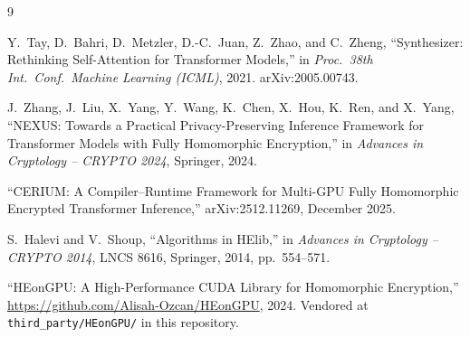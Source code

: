 \documentclass[11pt,a4paper]{article}
\begin{document}
\begin{thebibliography}{9}

Y.~Tay, D.~Bahri, D.~Metzler, D.-C.~Juan, Z.~Zhao, and C.~Zheng,
\newblock ``Synthesizer: Rethinking Self-Attention for Transformer Models,''
\newblock in \emph{Proc.\ 38th Int.\ Conf.\ Machine Learning (ICML)}, 2021.
\newblock arXiv:2005.00743.

J.~Zhang, J.~Liu, X.~Yang, Y.~Wang, K.~Chen, X.~Hou, K.~Ren, and X.~Yang,
\newblock ``NEXUS: Towards a Practical Privacy-Preserving Inference
Framework for Transformer Models with Fully Homomorphic Encryption,''
\newblock in \emph{Advances in Cryptology -- CRYPTO 2024}, Springer, 2024.

\newblock ``CERIUM: A Compiler--Runtime Framework for Multi-GPU Fully
Homomorphic Encrypted Transformer Inference,''
\newblock arXiv:2512.11269, December 2025.

S.~Halevi and V.~Shoup,
\newblock ``Algorithms in HElib,''
\newblock in \emph{Advances in Cryptology -- CRYPTO 2014}, LNCS 8616,
Springer, 2014, pp.~554--571.

\newblock ``HEonGPU: A High-Performance CUDA Library for Homomorphic
Encryption,'' \url{https://github.com/Alisah-Ozcan/HEonGPU}, 2024.
Vendored at \texttt{third\_party/HEonGPU/} in this repository.

\end{thebibliography}
\end{document}

